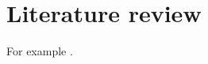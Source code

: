 \documentclass[doc/report.tex]{subfiles}
\begin{document}
\section{Literature review}

For example \cite{lee-art-som}.
    
\end{document}
